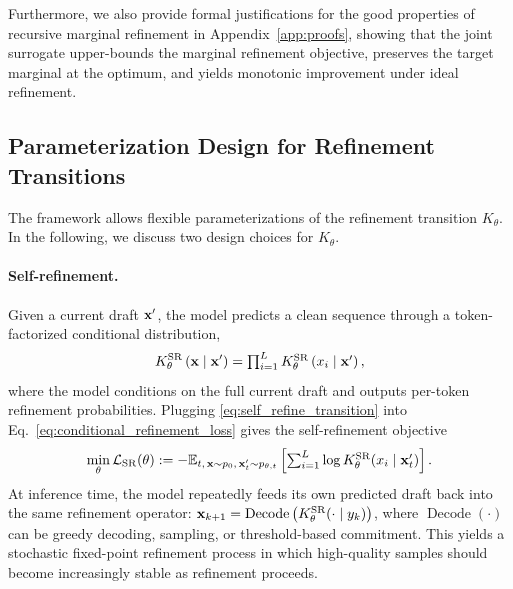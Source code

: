 Furthermore, we also provide formal justifications for the good properties of recursive marginal refinement in Appendix~\ref{app:proofs}, showing that the joint surrogate upper-bounds the marginal refinement objective, preserves the target marginal at the optimum, and yields monotonic improvement under ideal refinement.

\subsection{Parameterization Design for Refinement Transitions}
\label{sec:parameterization_design}
The \method framework allows flexible parameterizations of the refinement transition $K_{\theta}$. In the following, we discuss two design choices for $K_{\theta}$.

\paragraph{Self-refinement.}
Given a current draft $\mathbf{x}'$, the model predicts a clean sequence through a token-factorized conditional distribution, 
\begin{equation}
  K_{\theta}^\mathrm{SR}\left(\mathbf{x}\mid \mathbf{x}'\right)
    =\textstyle
    \prod_{i=1}^{L}
   K_{\theta}^\mathrm{SR}\left(x_i\mid \mathbf{x}'\right),
    \label{eq:self_refine_transition}
\end{equation}
where the model conditions on the full current draft and outputs per-token refinement probabilities. Plugging \eqref{eq:self_refine_transition} into Eq.~\eqref{eq:conditional_refinement_loss} gives the self-refinement objective
\begin{equation}
   \min_{\theta}  \mathcal{L}_{\mathrm{SR}}(\theta) :=-\mathbb{E}_{t,\,\mathbf{x}\sim p_0,\,\mathbf{x}'_t\sim p_{\theta,t}}
    \left[\textstyle\sum_{i=1}^{L}\log K_{\theta}^\mathrm{SR}(x_i\mid \mathbf{x}'_t)\right].
    \label{eq:self_refine_loss}
\end{equation}
At inference time, the model repeatedly feeds its own predicted draft back into the same refinement operator: $\mathbf{x}_{k+1} = \operatorname{Decode}\left(K_{\theta}^\mathrm{SR}(\cdot\mid y_k)\right)$, where $\operatorname{Decode}(\cdot)$ can be greedy decoding, sampling, or threshold-based commitment.  This yields a stochastic fixed-point refinement process in which high-quality samples should become increasingly stable as refinement proceeds.

